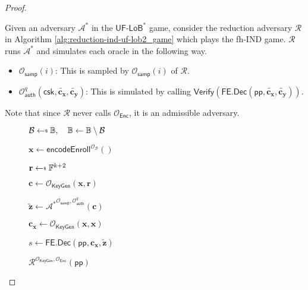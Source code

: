\begin{proof}
\label{proof:ind-uf-lob2}

Given an adversary $\mathcal{A}^*$ in the $\textsf{UF-LoB}^*$ game, consider the reduction adversary $\mathcal{R}$ in Algorithm \ref{alg:reduction-ind-uf-lob2_game} which plays the \textsf{fh-IND} game. $\mathcal{R}$ runs $\mathcal{A}^*$ and simulates each oracle in the following way.

\begin{itemize}
	\item $\mathcal{O}_{\textsf{samp}}(i)$: This is sampled by $\mathcal{O}_{\textsf{samp}}(i)$ of $\mathcal{R}$.
	
	\item $\mathcal{O}_{\textsf{auth}}^q (\textsf{csk}, \mathbf{\tilde{c_x}}, \mathbf{\tilde{c_y}})$: This is simulated by calling $\textsf{Verify}( \textsf{FE.Dec}(\textsf{pp}, \mathbf{\tilde{c_x}}, \mathbf{\tilde{c_y}}) )$.

\end{itemize}

\noindent Note that since $\mathcal{R}$ never calls $\mathcal{O}_{\textsf{Enc}}$, it is an admissible adversary.

\begin{figure}[h]
\centering
	
	\begin{minipage}[t]{0.5\linewidth}
	\centering
	\begin{algorithm}[H]
		\caption{$\mathcal{R}^{\mathcal{O}_{\textsf{KeyGen}}, \mathcal{O}_{\textsf{Enc}}}(\textsf{pp})$}
	\label{alg:reduction-ind-uf-lob2_game}
	\begin{algorithmic}[1]
		\State $\mathcal{B} \getsdollar \mathbb{B}, \quad \mathbb{B} \gets \mathbb{B} \setminus \mathcal{B}$

		\State $\mathbf{x} \gets \textsf{encodeEnroll}^{\mathcal{O}_{\mathcal{B}}}()$

		\State $\mathbf{r} \getsdollar \mathbb{F}^{k+2}$
		
		\State $\mathbf{c} \gets \mathcal{O}_{\textsf{KeyGen}}(\mathbf{x}, \mathbf{r})$ \label{alg:reduction-ind-uf-lob2_game:c}

		\State ${\mathbf{\tilde{z}}} \gets {\mathcal{A}^*}^{\mathcal{O}_{\textsf{samp}}, \mathcal{O}_\textsf{auth}^q } ( \mathbf{c})$

		\State $\mathbf{c_x} \gets \mathcal{O}_{\textsf{KeyGen}}(\mathbf{x}, \mathbf{x})$

		\State $s \gets \textsf{FE.Dec}( \textsf{pp}, \mathbf{c_x}, \mathbf{\tilde{z}} )$


\end{algorithmic}
\end{algorithm}
\end{minipage}
\end{figure}
\end{proof}
